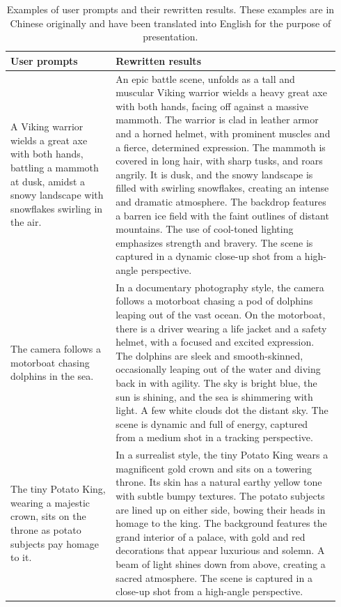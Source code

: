 
\begin{table}[!t]
    \centering
    \begin{tabular}{p{0.3\linewidth} p{0.64\linewidth}}
        \toprule
        User prompts & Rewritten results \\
        \midrule
        A Viking warrior wields a great axe with both hands, battling a mammoth at dusk, amidst a snowy landscape with snowflakes swirling in the air. & An epic battle scene, unfolds as a tall and muscular Viking warrior wields a heavy great axe with both hands, facing off against a massive mammoth. The warrior is clad in leather armor and a horned helmet, with prominent muscles and a fierce, determined expression. The mammoth is covered in long hair, with sharp tusks, and roars angrily. It is dusk, and the snowy landscape is filled with swirling snowflakes, creating an intense and dramatic atmosphere. The backdrop features a barren ice field with the faint outlines of distant mountains. The use of cool-toned lighting emphasizes strength and bravery. The scene is captured in a dynamic close-up shot from a high-angle perspective. \\
        \midrule
        The camera follows a motorboat chasing dolphins in the sea. & In a documentary photography style, the camera follows a motorboat chasing a pod of dolphins leaping out of the vast ocean. On the motorboat, there is a driver wearing a life jacket and a safety helmet, with a focused and excited expression. The dolphins are sleek and smooth-skinned, occasionally leaping out of the water and diving back in with agility. The sky is bright blue, the sun is shining, and the sea is shimmering with light. A few white clouds dot the distant sky. The scene is dynamic and full of energy, captured from a medium shot in a tracking perspective. \\
        \midrule
        The tiny Potato King, wearing a majestic crown, sits on the throne as potato subjects pay homage to it. & In a surrealist style, the tiny Potato King wears a magnificent gold crown and sits on a towering throne. Its skin has a natural earthy yellow tone with subtle bumpy textures. The potato subjects are lined up on either side, bowing their heads in homage to the king. The background features the grand interior of a palace, with gold and red decorations that appear luxurious and solemn. A beam of light shines down from above, creating a sacred atmosphere. The scene is captured in a close-up shot from a high-angle perspective. \\
        \bottomrule
    \end{tabular}
    \caption{Examples of user prompts and their rewritten results. These examples are in Chinese originally and have been translated into English for the purpose of presentation.}
    \label{tab:rewritten_prompts}
\end{table}


